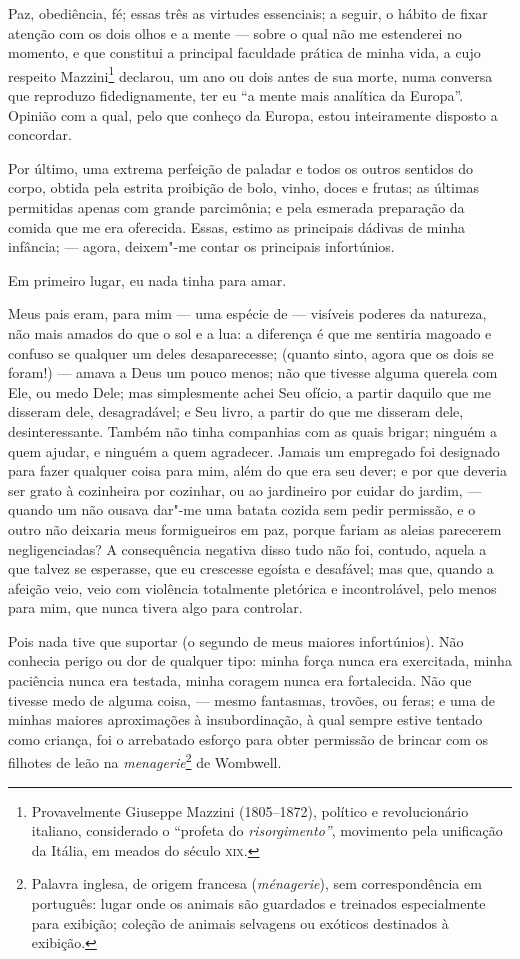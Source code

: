 Paz, obediência, fé; essas três as virtudes essenciais; a seguir, o
hábito de fixar atenção com os dois olhos e a mente --- sobre o qual não
me estenderei no momento, e que constitui a principal faculdade prática
de minha vida, a cujo respeito Mazzini\footnote{Provavelmente Giuseppe
  Mazzini (1805--1872), político e revolucionário italiano,
  considerado o ``profeta do \textit{risorgimento''}, movimento pela
  unificação da Itália, em meados do século \textsc{xix}.} declarou,
um ano ou dois antes de sua morte, numa conversa que reproduzo
fidedignamente, ter eu ``a mente mais analítica da Europa''. Opinião
com a qual, pelo que conheço da Europa, estou inteiramente disposto a
concordar.

Por último, uma extrema perfeição de paladar e todos os outros sentidos
do corpo, obtida pela estrita proibição de bolo, vinho, doces e frutas;
as últimas permitidas apenas com grande parcimônia; e pela esmerada
preparação da comida que me era oferecida. Essas, estimo as principais
dádivas de minha infância; --- agora, deixem"-me contar os principais
infortúnios.

Em primeiro lugar, eu nada tinha para amar.

Meus pais eram, para mim --- uma espécie de --- visíveis poderes da
natureza, não mais amados do que o sol e a lua: a diferença é que me
sentiria magoado e confuso se qualquer um deles desaparecesse; (quanto
sinto, agora que os dois se foram!) --- amava a Deus um pouco menos; não
que tivesse alguma querela com Ele, ou medo Dele; mas simplesmente achei
Seu ofício, a partir daquilo que me disseram dele, desagradável; e Seu
livro, a partir do que me disseram dele, desinteressante. Também não
tinha companhias com as quais brigar; ninguém a quem ajudar, e ninguém a
quem agradecer. Jamais um empregado foi designado para fazer qualquer
coisa para mim, além do que era seu dever; e por que deveria ser grato à
cozinheira por cozinhar, ou ao jardineiro por cuidar do jardim, ---
quando um não ousava dar"-me uma batata cozida sem pedir permissão, e o
outro não deixaria meus formigueiros em paz, porque fariam as aleias
parecerem negligenciadas? A consequência negativa disso tudo não foi,
contudo, aquela a que talvez se esperasse, que eu crescesse egoísta e
desafável; mas que, quando a afeição veio, veio com violência totalmente
pletórica e incontrolável, pelo menos para mim, que nunca tivera algo
para controlar.

Pois nada tive que suportar (o segundo de meus maiores infortúnios).
Não conhecia perigo ou dor de qualquer tipo: minha força nunca era
exercitada, minha paciência nunca era testada, minha coragem nunca era
fortalecida. Não que tivesse medo de alguma coisa, --- mesmo fantasmas,
trovões, ou feras; e uma de minhas maiores aproximações à
insubordinação, à qual sempre estive tentado como criança, foi o
arrebatado esforço para obter permissão de brincar com os filhotes de
leão na \textit{menagerie}\footnote{Palavra inglesa, de origem francesa
  (\textit{ménagerie}), sem correspondência em português: lugar onde os
  animais são guardados e treinados especialmente para exibição; coleção
  de animais selvagens ou exóticos destinados à exibição.}
de Wombwell.

